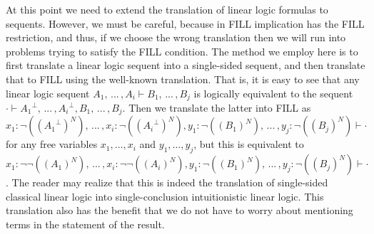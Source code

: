 \documentclass{elsarticle}
\newcommand{\FILLnt}[1]{\mathit{#1}}
\newcommand{\FILLmv}[1]{\mathit{#1}}
\newcommand{\FILLsym}[1]{#1}
\begin{document}
At this point we need to extend the translation of linear logic
formulas to sequents.  However, we must be careful, because in FILL
implication has the FILL restriction, and thus, if we choose the wrong
translation then we will run into problems trying to satisfy the FILL
condition.  The method we employ here is to first translate a linear
logic sequent into a single-sided sequent, and then translate that to
FILL using the well-known translation.  That is, it is easy to see
that any linear logic sequent $ \FILLnt{A_{{\mathrm{1}}}}  \FILLsym{,} \, ... \, \FILLsym{,}  \FILLnt{A_{\FILLmv{i}}}  \vdash  \FILLnt{B_{{\mathrm{1}}}}  \FILLsym{,} \, ... \, \FILLsym{,}  \FILLnt{B_{\FILLmv{j}}} $ is
logically equivalent to the sequent $  \cdot   \vdash   \FILLnt{A_{{\mathrm{1}}}} ^{\perp}   \FILLsym{,} \, ... \, \FILLsym{,}   \FILLnt{A_{\FILLmv{i}}} ^{\perp}   \FILLsym{,}  \FILLnt{B_{{\mathrm{1}}}}  \FILLsym{,} \, ... \, \FILLsym{,}  \FILLnt{B_{\FILLmv{j}}} $.  Then we translate the latter into FILL as $ \FILLmv{x_{{\mathrm{1}}}}  \FILLsym{:}   \lnot  \FILLsym{(}   (  \FILLnt{A_{{\mathrm{1}}}} ^{\perp}  )^N   \FILLsym{)}   \FILLsym{,} \, ... \, \FILLsym{,}  \FILLmv{x_{\FILLmv{i}}}  \FILLsym{:}   \lnot  \FILLsym{(}   (  \FILLnt{A_{\FILLmv{i}}} ^{\perp}  )^N   \FILLsym{)}   \FILLsym{,}  \FILLmv{y_{{\mathrm{1}}}}  \FILLsym{:}   \lnot  \FILLsym{(}   ( \FILLnt{B_{{\mathrm{1}}}} )^N   \FILLsym{)}   \FILLsym{,} \, ... \, \FILLsym{,}  \FILLmv{y_{\FILLmv{j}}}  \FILLsym{:}   \lnot  \FILLsym{(}   ( \FILLnt{B_{\FILLmv{j}}} )^N   \FILLsym{)}   \vdash   \cdot  $ for any free variables $\FILLmv{x_{{\mathrm{1}}}},\ldots,\FILLmv{x_{\FILLmv{i}}}$ and
$\FILLmv{y_{{\mathrm{1}}}},\ldots,\FILLmv{y_{\FILLmv{j}}}$, but this is equivalent to $ \FILLmv{x_{{\mathrm{1}}}}  \FILLsym{:}   \lnot    \lnot  \FILLsym{(}   ( \FILLnt{A_{{\mathrm{1}}}} )^N   \FILLsym{)}     \FILLsym{,} \, ... \, \FILLsym{,}  \FILLmv{x_{\FILLmv{i}}}  \FILLsym{:}   \lnot    \lnot  \FILLsym{(}   ( \FILLnt{A_{\FILLmv{i}}} )^N   \FILLsym{)}     \FILLsym{,}  \FILLmv{y_{{\mathrm{1}}}}  \FILLsym{:}   \lnot  \FILLsym{(}   ( \FILLnt{B_{{\mathrm{1}}}} )^N   \FILLsym{)}   \FILLsym{,} \, ... \, \FILLsym{,}  \FILLmv{y_{\FILLmv{j}}}  \FILLsym{:}   \lnot  \FILLsym{(}   ( \FILLnt{B_{\FILLmv{j}}} )^N   \FILLsym{)}   \vdash   \cdot  $.  The reader may realize that this is indeed the
translation of single-sided classical linear logic into
single-conclusion intuitionistic linear logic.  This translation also
has the benefit that we do not have to worry about mentioning terms in
the statement of the result.
\end{document}
